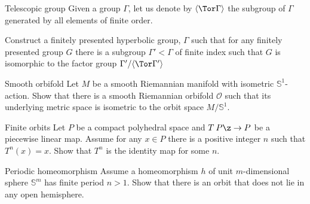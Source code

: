 \begin{pr}{}{Telescopic group}
Given a group $\Gamma$, let us denote by $\langle\Tor\Gamma\rangle$ the subgroup of $\Gamma$ generated by all elements of finite order.

Construct a finitely presented hyperbolic group, $\Gamma$ such that for any finitely presented group $G$ there is a subgroup $\Gamma'<\Gamma$ of finite index such that 
$G$ is isomorphic to the factor group $\Gamma'/\langle\Tor\Gamma'\rangle$
\end{pr}



\begin{pr}{}{Smooth orbifold}\label{Smooth orbifold}
Let $M$ be a smooth Riemannian manifold with isometric 
$\mathbb{S}^1$-action.
Show that there is a smooth Riemannian orbifold $\mathcal{O}$
such that its underlying metric space 
is isometric to the orbit space $M/\mathbb{S}^1$.
\end{pr}


\begin{pr}{}{Finite orbits}\label{Finite orbits}
Let $P$ be a compact polyhedral space and $T\:P\z\to P$ be a piecewise linear map.
Assume for any $x\in P$ there is a positive integer $n$ such that
$T^n(x)=x$.
Show that $T^n$ is the identity map for some $n$. 
\end{pr}

\begin{pr}{\easy}{Periodic homeomorphism}\label{Finite action}
Assume a homeomorphism $h$ of unit $m$-dimensional sphere $\mathbb S^m$ has  finite period $n>1$.
Show that there is an orbit that does not lie in any open hemisphere.
\end{pr}
